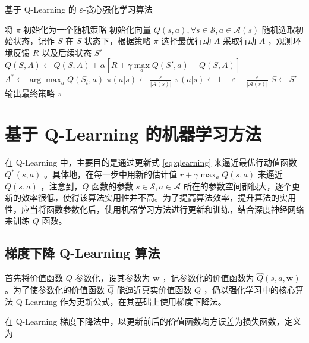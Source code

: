 \begin{algorithm}[H]
    \caption{基于 Q-Learning 的 $\varepsilon$-贪心强化学习算法}
    \begin{algorithmic}[1] %
        \State 将 $\pi$ 初始化为一个随机策略
        \State 初始化向量 $Q(s,a), \forall s\in \mathcal S,a\in \mathcal{A}(s)$
        \Loop
        \State 随机选取初始状态，记作 $S$
        \Repeat
        \State 在 $S$ 状态下，根据策略 $\pi$ 选择最优行动 $A$
        \State 采取行动 $A$ ，观测环境反馈 $R$ 以及后续状态 $S'$
        \State $Q(S,A)\leftarrow Q(S,A)+\alpha\left[R+\gamma  \max\limits_aQ(S',a)-Q(S,A)\right]$
        \State $A^*\leftarrow\arg\max_aQ(S_t,a)$
        \State $\pi(a|s)\leftarrow \frac{\varepsilon}{|\mathcal A(s)|}$
        \Else
        \State $\pi(a|s)\leftarrow 1-\varepsilon-\frac{\varepsilon}{|\mathcal A(s)|}$
        \EndIf
        \EndFor
        \State $S\leftarrow S'$
        \EndLoop
        \State
        \State 输出最终策略 $\pi$
    \end{algorithmic}
\end{algorithm}

\chapter{基于 Q-Learning 的机器学习方法}

在 Q-Learning 中，主要目的是通过更新式 \ref{eq:qlearning} 来逼近最优行动值函数 $Q^*(s,a)$ 。具体地，在每一步中用新的估计值 $r+\gamma \max_aQ(s,a)$ 来逼近 $Q(s,a)$ ，注意到，$Q$ 函数的参数 $s\in\mathcal S, a\in\mathcal A$ 所在的参数空间都很大，逐个更新的效率很低，使得该算法实用性并不高。为了提高算法效率，提升算法的实用性，应当将函数参数化后，使用机器学习方法进行更新和训练，结合深度神经网络来训练 $Q$ 函数。

\section{梯度下降 Q-Learning 算法}

首先将价值函数 $Q$ 参数化，设其参数为 $\boldsymbol{w}$ ，记参数化的价值函数为 $\widehat{Q}(s,a,\boldsymbol{w})$。为了使参数化的价值函数 $\widehat{Q}$ 能逼近真实价值函数 $Q$ ，仍以强化学习中的核心算法 Q-Learning 作为更新公式，在其基础上使用梯度下降法\cite{tsitsiklis1997analysis}\cite{bottou2010large}\cite{sutton2009fast}。

在 Q-Learning 梯度下降法中，以更新前后的价值函数均方误差为损失函数，定义为

